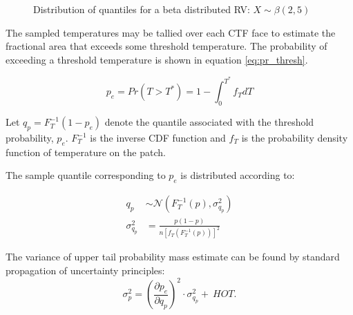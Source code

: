 \begin{figure}[H]%
    \centering
    \qquad
    \qquad
    \qquad
    \qquad
    \caption[Distribution of quantiles for a beta distributed RV.]{Distribution of quantiles for a beta distributed RV: $X \sim \beta(2, 5)$}%
    \label{fig:beta_g_theory}%
\end{figure}

The sampled temperatures may be tallied over each CTF face to estimate the fractional area that exceeds some threshold temperature.  The probability of exceeding a threshold temperature is shown in equation \ref{eq:pr_thresh}.
    
    \begin{equation}
    p_e = Pr(T > T^*) = 1 - \int_0^{T^*} f_T dT
    \label{eq:pr_thresh}
    \end{equation}
    
    Let $q_p = F_T^{-1}(1 - p_e)$
    denote the quantile associated with the threshold probability, $p_e$.
    $F_T^{-1}$ is the inverse CDF function and $f_T$ is the probability density function of temperature on the patch.
    
    The sample quantile corresponding to $p_e$ is distributed according to:

   \begin{eqnarray}
    q_p &\sim \mathcal N \left( F_T^{-1}(p), \sigma^2_{q_p} \right) \\
    \sigma^2_{q_p} &= \frac{p(1 - p)}{n[f_T(F_T^{-1}(p))]^2}
    \end{eqnarray}
    
    The variance of upper tail probability mass estimate can be found by standard propagation of uncertainty principles:
   \begin{equation}
    \sigma_p^2 = \left(\frac{\partial p_e}{\partial q_p} \right)^2 \cdot \sigma_{q_p}^2 +\  HOT.
    \label{eq:pr_thresh_uncert}
    \end{equation}
    
